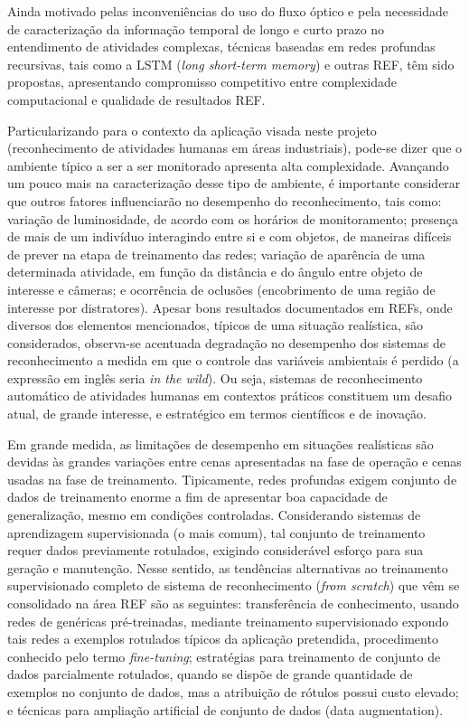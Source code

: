 %
Ainda motivado pelas inconveniências do uso do fluxo óptico e pela necessidade de caracterização da informação temporal de longo e curto prazo no entendimento de atividades complexas, técnicas baseadas em redes profundas recursivas, tais como a LSTM (\emph{long short-term memory}) e outras REF, têm sido propostas, apresentando compromisso competitivo entre complexidade computacional e qualidade de resultados REF.

Particularizando para o contexto da aplicação visada neste projeto (reconhecimento de atividades humanas em áreas industriais), pode-se dizer que o ambiente típico a ser a ser monitorado apresenta alta complexidade. Avançando um pouco mais na caracterização desse tipo de ambiente, é importante considerar que outros fatores influenciarão no desempenho do reconhecimento, tais como: variação de luminosidade, de acordo com os horários de monitoramento; presença de mais de um indivíduo interagindo entre si e com objetos, de maneiras difíceis de prever na etapa de treinamento das redes; variação de aparência de uma determinada atividade, em função da distância e do ângulo entre objeto de interesse e câmeras; e ocorrência de oclusões (encobrimento de uma região de interesse por distratores).
%
Apesar bons resultados documentados em REFs, onde diversos dos elementos mencionados, típicos de uma situação realística, são considerados, observa-se acentuada degradação no desempenho dos sistemas de reconhecimento a medida em que o controle das variáveis ambientais é perdido (a expressão em inglês seria \emph{in the wild}). Ou seja, sistemas de reconhecimento automático de atividades humanas em contextos práticos constituem um desafio atual, de grande interesse, e estratégico em termos científicos e de inovação.

Em grande medida, as limitações de desempenho em situações realísticas são devidas às grandes variações entre cenas apresentadas na fase de operação e cenas usadas na fase de treinamento. Tipicamente, redes profundas exigem  conjunto de dados de treinamento enorme a fim de apresentar boa capacidade de generalização, mesmo em condições controladas. Considerando sistemas de aprendizagem supervisionada (o mais comum), tal conjunto de treinamento requer dados previamente rotulados, exigindo considerável esforço para sua geração e manutenção. Nesse sentido, as tendências alternativas ao treinamento supervisionado completo de sistema de reconhecimento (\emph{from scratch}) que vêm se consolidado na área REF são as seguintes: transferência de conhecimento, usando redes de genéricas pré-treinadas, mediante treinamento supervisionado expondo tais redes a exemplos rotulados típicos da aplicação pretendida, procedimento conhecido pelo termo \emph{fine-tuning}; estratégias para treinamento de conjunto de dados parcialmente rotulados, quando se dispõe de grande quantidade de exemplos no conjunto de dados, mas a atribuição de rótulos possui custo elevado; e técnicas para ampliação artificial de conjunto de dados (data augmentation).

